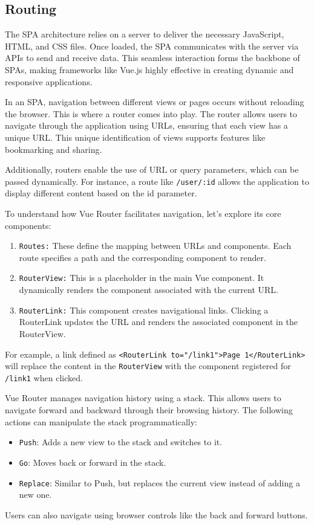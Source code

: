 \subsection*{Routing}
The SPA architecture relies on a server to deliver the necessary JavaScript, HTML, and CSS files. Once loaded, the SPA communicates with the server via APIs to send and receive data. This seamless interaction forms the backbone of SPAs, making frameworks like Vue.js highly effective in creating dynamic and responsive applications.

In an SPA, navigation between different views or pages occurs without reloading the browser. This is where a router comes into play. The router allows users to navigate through the application using URLs, ensuring that each view has a unique URL. This unique identification of views supports features like bookmarking and sharing.

Additionally, routers enable the use of URL or query parameters, which can be passed dynamically. For instance, a route like \texttt{/user/:id} allows the application to display different content based on the id parameter.

To understand how Vue Router facilitates navigation, let’s explore its core components:
\begin{enumerate}
    \item \texttt{Routes:} These define the mapping between URLs and components. Each route specifies a path and the corresponding component to render.
    \item \texttt{RouterView:} This is a placeholder in the main Vue component. It dynamically renders the component associated with the current URL.
    \item \texttt{RouterLink:} This component creates navigational links. Clicking a RouterLink updates the URL and renders the associated component in the RouterView.
\end{enumerate}
For example, a link defined as \texttt{<RouterLink to="/link1">Page 1</RouterLink>} will replace the content in the \texttt{RouterView} with the component registered for \texttt{/link1} when clicked.

Vue Router manages navigation history using a stack. This allows users to navigate forward and backward through their browsing history. The following actions can manipulate the stack programmatically:
\begin{itemize}
    \item \texttt{Push}: Adds a new view to the stack and switches to it.
    \item \texttt{Go}: Moves back or forward in the stack.
    \item \texttt{Replace}: Similar to Push, but replaces the current view instead of adding a new one.
\end{itemize}
Users can also navigate using browser controls like the back and forward buttons.

